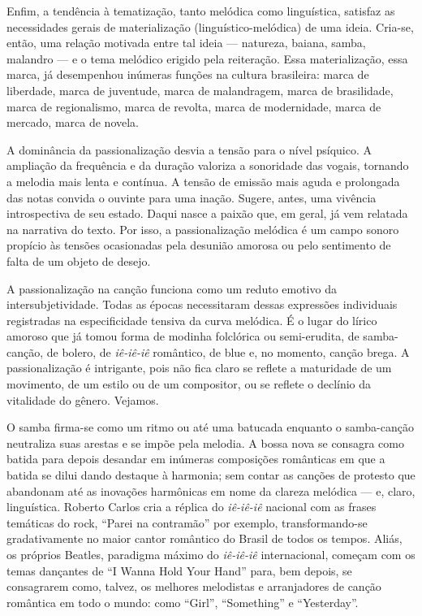 Enfim, a
tendência à tematização, tanto melódica como linguística, satisfaz as
necessidades gerais de materialização (linguístico-melódica) de uma
ideia. Cria-se, então, uma relação motivada entre tal ideia --- natureza,
baiana, samba, malandro --- e o tema melódico erigido pela reiteração. Essa
materialização, essa marca, já desempenhou inúmeras funções na cultura
brasileira: marca de liberdade, marca de juventude, marca de
malandragem, marca de brasilidade, marca de regionalismo, marca de
revolta, marca de modernidade, marca de mercado, marca de novela.

A dominância da passionalização desvia a tensão para o nível psíquico. A
ampliação da frequência e da duração valoriza a sonoridade das vogais,
tornando a melodia mais lenta e contínua. A tensão de emissão mais aguda
e prolongada das notas convida o ouvinte para uma inação. Sugere, antes,
uma vivência introspectiva de seu estado. Daqui nasce a paixão que, em
geral, já vem relatada na narrativa do texto. Por isso, a
passionalização melódica é um campo sonoro propício às tensões
ocasionadas pela desunião amorosa ou pelo sentimento de falta de um
objeto de desejo.

A passionalização na canção funciona como um reduto emotivo da
intersubjetividade. Todas as épocas necessitaram dessas expressões
individuais registradas na especificidade tensiva da curva melódica. É o
lugar do lírico amoroso que já tomou forma de modinha folclórica ou
semi-erudita, de samba-canção, de bolero, de \textit{iê-iê-iê} romântico, de blue
e, no momento, canção brega. A passionalização é intrigante, pois não
fica claro se reflete a maturidade de um movimento, de um estilo ou de
um compositor, ou se reflete o declínio da vitalidade do gênero.
Vejamos.

O samba firma-se como um ritmo ou até uma batucada enquanto o
samba-canção neutraliza suas arestas e se impõe pela melodia. A bossa
nova se consagra como batida para depois desandar em inúmeras
composições românticas em que a batida se dilui dando destaque à
harmonia; sem contar as canções de protesto que abandonam até as
inovações harmônicas em nome da clareza melódica --- e, claro,
linguística. Roberto Carlos cria a réplica do \textit{iê-iê-iê} nacional com as
frases temáticas do rock, ``Parei na contramão'' por exemplo,
transformando-se gradativamente no maior cantor romântico do Brasil de
todos os tempos. Aliás, os próprios Beatles, paradigma máximo do
\textit{iê-iê-iê} internacional, começam com os temas dançantes de ``I Wanna Hold
Your Hand'' para, bem depois, se consagrarem como, talvez, os melhores
melodistas e arranjadores de canção romântica em todo o mundo: como ``Girl'',
``Something'' e ``Yesterday''.

